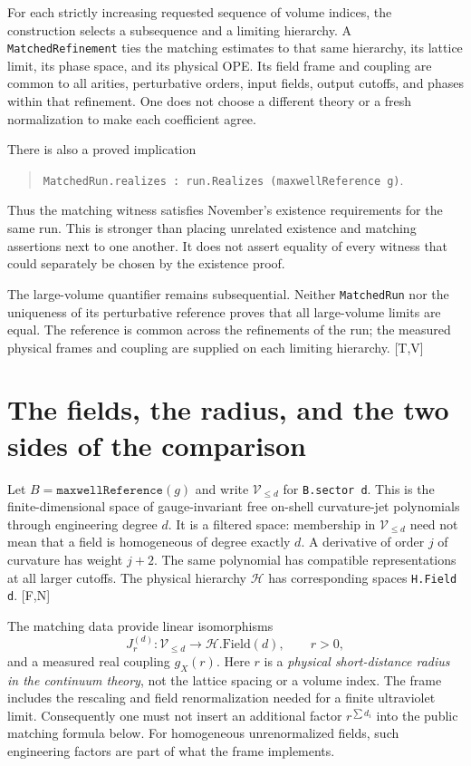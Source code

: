 \documentclass[11pt]{article}
\newcommand{\code}[1]{{\small\nolinkurl{#1}}}
\newcommand{\src}[1]{\textsf{[#1]}}
\begin{document}
For each strictly increasing requested sequence of volume indices, the
construction selects a subsequence and a limiting hierarchy. A
\code{MatchedRefinement} ties the matching estimates to that same
hierarchy, its lattice limit, its phase space, and its physical OPE.
Its field frame and coupling are common to all arities, perturbative
orders, input fields, output cutoffs, and phases within that refinement.
One does not choose a different theory or a fresh normalization to make
each coefficient agree.

There is also a proved implication
\begin{quote}
\code{MatchedRun.realizes : run.Realizes (maxwellReference g)}.
\end{quote}
Thus the matching witness satisfies November's existence requirements
for the same run. This is stronger than placing unrelated existence and
matching assertions next to one another. It does not assert equality
of every witness that could separately be chosen by the existence proof.

The large-volume quantifier remains subsequential. Neither
\code{MatchedRun} nor the uniqueness of its perturbative reference proves
that all large-volume limits are equal. The reference is common across
the refinements of the run; the measured physical frames and coupling
are supplied on each limiting hierarchy. \src{T,V}

\section{The fields, the radius, and the two sides of the comparison}
\label{sec:objects}

Let $B=\texttt{maxwellReference}(g)$ and write $\mathcal V_{\le d}$ for
\code{B.sector d}. This is the finite-dimensional space of gauge-invariant
free on-shell curvature-jet polynomials through engineering degree $d$.
It is a filtered space: membership in $\mathcal V_{\le d}$ need not mean
that a field is homogeneous of degree exactly $d$. A derivative of order
$j$ of curvature has weight $j+2$. The same polynomial has compatible
representations at all larger cutoffs. The physical hierarchy $\mathcal H$
has corresponding spaces \code{H.Field d}. \src{F,N}

The matching data provide linear isomorphisms
\begin{equation}\label{eq:frame}
 J_r^{(d)}:\mathcal V_{\le d}\longrightarrow\mathcal H.\mathrm{Field}(d),
 \qquad r>0,
\end{equation}
and a measured real coupling $g_X(r)$. Here $r$ is a \emph{physical
short-distance radius in the continuum theory}, not the lattice spacing
or a volume index. The frame includes the rescaling and field
renormalization needed for a finite ultraviolet limit. Consequently one
must not insert an additional factor $r^{\sum d_i}$ into the public
matching formula below. For homogeneous unrenormalized fields, such
engineering factors are part of what the frame implements.
\end{document}
